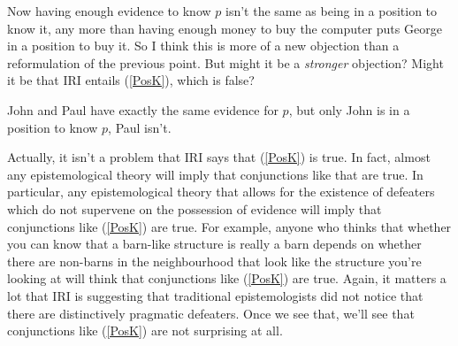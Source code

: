 \documentclass[oneside]{book}
\renewcommand{\numbex}[2]{
\begin{enumerate*}
\setcounter{enumi}{\value{paper}}
\renewcommand{\labelenumi}{(\arabic{enumi})}
#2
\end{enumerate*}
\addtocounter{paper}{#1}}
\begin{document}
\noindent Now having enough evidence to know $p$ isn't the same as being in a position to know it, any more than having enough money to buy the computer puts George in a position to buy it. So I think this is more of a new objection than a reformulation of the previous point. But might it be a \textit{stronger} objection? Might it be that IRI entails (\ref{PosK}), which is false?

\numbex{1}{
\item \label{PosK} John and Paul have exactly the same evidence for $p$, but only John is in a position to know $p$, Paul isn't.}

\noindent Actually, it isn't a problem that IRI says that (\ref{PosK}) is true. In fact, almost any epistemological theory will imply that conjunctions like that are true. In particular, any epistemological theory that allows for the existence of defeaters which do not supervene on the possession of evidence will imply that conjunctions like (\ref{PosK}) are true. For example, anyone who thinks that whether you can know that a barn-like structure is really a barn depends on whether there are non-barns in the neighbourhood that look like the structure you're looking at will think that conjunctions like (\ref{PosK}) are true. Again, it matters a lot that IRI is suggesting that traditional epistemologists did not notice that there are distinctively pragmatic defeaters. Once we see that, we'll see that conjunctions like (\ref{PosK}) are not surprising at all.

\end{document}
